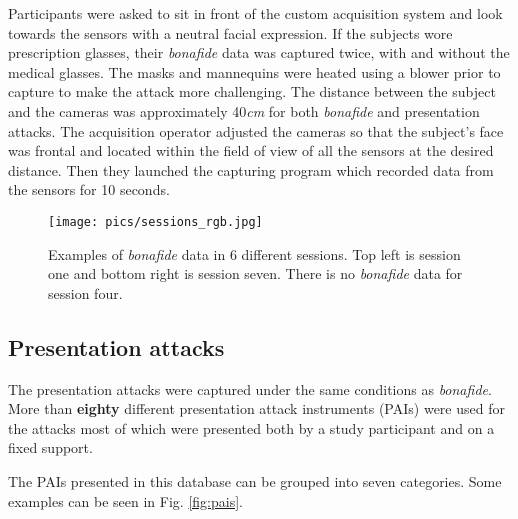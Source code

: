 \documentclass[journal]{IEEEtran}
\begin{document}
Participants were asked to sit in front of the custom acquisition system and look towards the sensors with a neutral facial expression. If the subjects wore prescription glasses, their \textit{bonafide} data was captured twice, with and without the medical glasses. The masks and mannequins were heated using a blower prior to capture to make the attack more challenging. 
The distance between the subject and the cameras was approximately 40\textit{cm} for both \textit{bonafide} and presentation attacks. 
 The acquisition operator adjusted the cameras so that the subject's face was frontal and located within the field of view of all the sensors at the desired distance. Then they launched the capturing program which recorded data from the sensors for 10 seconds.

\begin{figure}[ht]
    \centering
    \texttt{[image: pics/sessions\_rgb.jpg]}
    \caption{Examples of \textit{bonafide} data in 6 different sessions. Top left is session one and bottom right is session seven. There is no \textit{bonafide} data for session four.}
    \label{fig:bf_rgb}
\end{figure}

\subsection{Presentation attacks}
The presentation attacks were captured under the same conditions as \textit{bonafide}. More than \textbf{eighty} different presentation attack instruments (PAIs) were used for the attacks most of which were presented both by a study participant and on a fixed support.

The PAIs presented in this database can be grouped into seven categories. Some examples can be seen in Fig. \ref{fig:pais}.
\end{document}

